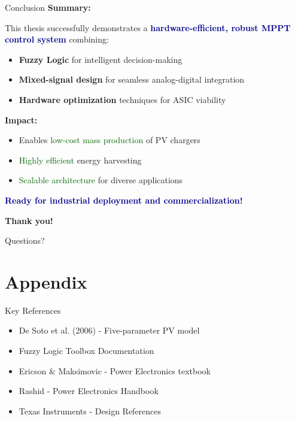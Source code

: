 \documentclass[aspectratio=169,usenames,dvipsnames]{beamer}
\newcommand{\highlight}[1]{\textcolor{darkblue}{\textbf{#1}}}
\begin{document}
\begin{frame}{Conclusion}
    \textbf{Summary:}
    
    \vspace{0.3cm}
    This thesis successfully demonstrates a \highlight{hardware-efficient, robust MPPT control system} combining:
    
    \begin{itemize}
        \item \textbf{Fuzzy Logic} for intelligent decision-making
        \item \textbf{Mixed-signal design} for seamless analog-digital integration
        \item \textbf{Hardware optimization} techniques for ASIC viability
    \end{itemize}
    
    \vspace{0.3cm}
    \textbf{Impact:}
    \begin{itemize}
        \item Enables \textcolor{darkgreen}{low-cost mass production} of PV chargers
        \item \textcolor{darkgreen}{Highly efficient} energy harvesting
        \item \textcolor{darkgreen}{Scalable architecture} for diverse applications
    \end{itemize}
    
    \vspace{0.3cm}
    \highlight{Ready for industrial deployment and commercialization!}
\end{frame}

\begin{frame}
    \centering
    \Huge \textbf{Thank you!}
    
    \vspace{0.5cm}
    \large Questions?
\end{frame}

\section{Appendix}

\begin{frame}{Key References}
    \small
    \begin{itemize}
        \item De Soto et al. (2006) - Five-parameter PV model
        \item Fuzzy Logic Toolbox Documentation
        \item Ericson \& Maksimovic - Power Electronics textbook
        \item Rashid - Power Electronics Handbook
        \item Texas Instruments - Design References
    \end{itemize}
\end{frame}
\end{document}
